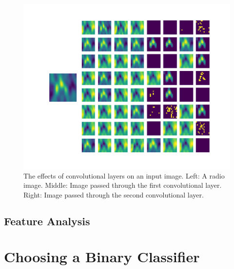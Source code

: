       \begin{figure}[!ht]
        \centering
        \includegraphics[width=\textwidth]{images/cnn_outputs.pdf}
        \caption{The effects of convolutional layers on an input image. Left: A
          radio image. Middle: Image passed through the first convolutional
          layer. Right: Image passed through the second convolutional layer.}
      \end{figure}

  \subsection{Feature Analysis}
  \label{sec:feature-analysis}


\section{Choosing a Binary Classifier}
\label{sec:binary-classifiers}
  
